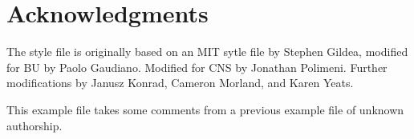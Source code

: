 \documentclass[11pt]{report}
\begin{document}


\maketitle




\approvalpage


\newpage
\section*{Acknowledgments}

The style file is originally based on an MIT sytle file by Stephen
Gildea, modified for BU by Paolo Gaudiano.  Modified for CNS by
Jonathan Polimeni.  Further modifications by Janusz Konrad, Cameron
Morland, and Karen Yeats.

This example file takes some comments from a previous example file of
unknown authorship.

\end{document}
